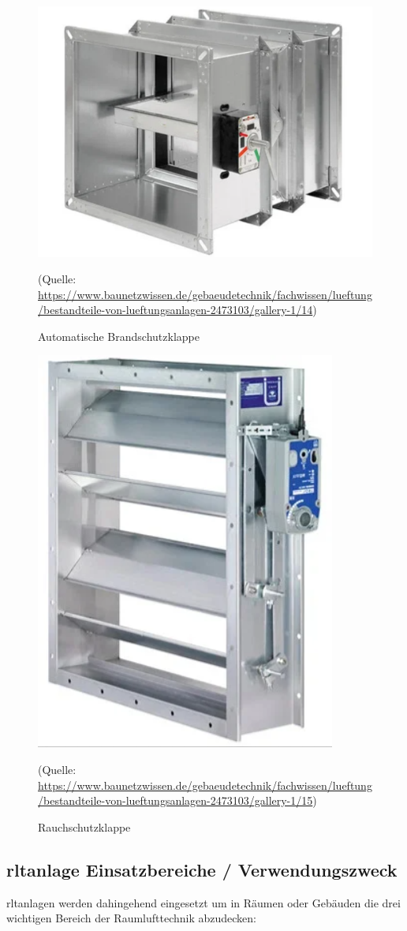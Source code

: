 \begin{figure}[H]
	\centering
	\includegraphics[width=0.5\linewidth]{Bilder/brandschutzklappe}
	\caption{Automatische Brandschutzklappe} 
	(Quelle: \url{	https://www.baunetzwissen.de/gebaeudetechnik/fachwissen/lueftung/bestandteile-von-lueftungsanlagen-2473103/gallery-1/14})
	\label{fig:Brandschutzklappe}
\end{figure}

\begin{figure}[H]
	\centering
	\includegraphics[width=0.5\linewidth]{Bilder/rauchschutzklappe}
	\caption{Rauchschutzklappe} 
	(Quelle: \url{	https://www.baunetzwissen.de/gebaeudetechnik/fachwissen/lueftung/bestandteile-von-lueftungsanlagen-2473103/gallery-1/15})
	\label{fig:Rauchschutzklappe}
\end{figure}

\cite[vgl.][]{baunetz_bestandteile_nodate:o.J.}

\subsection{\ac{rltanlage} Einsatzbereiche / Verwendungszweck}

\ac{rltanlage}n werden dahingehend eingesetzt um in Räumen oder Gebäuden die drei wichtigen Bereich der Raumlufttechnik abzudecken:

